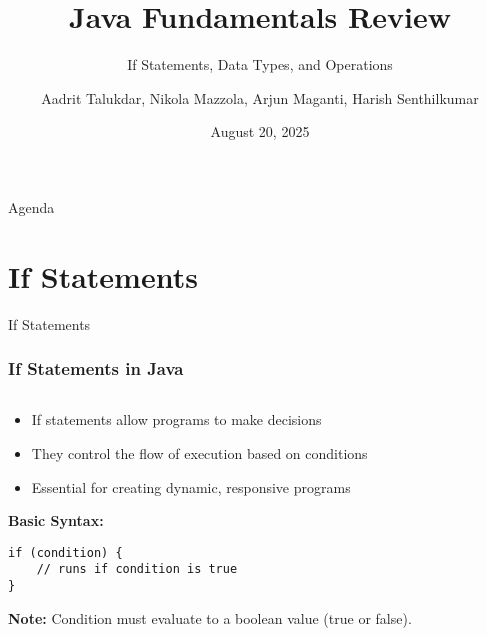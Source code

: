 \documentclass[aspectratio=169]{beamer}
\title{Java Fundamentals Review}
\subtitle{If Statements, Data Types, and Operations}
\author{Aadrit Talukdar, Nikola Mazzola, Arjun Maganti, Harish Senthilkumar}
\institute{Basis Independent Silicon Valley}
\date{August 20, 2025}
\begin{document}
\begin{frame}
    \titlepage
\end{frame}

\begin{frame}{Agenda}
    \tableofcontents
\end{frame}

\section{If Statements}

\begin{frame}[fragile]{If Statements}
    \frametitle{If Statements in Java}
    
    \begin{columns}
        \begin{column}{0.7\textwidth}
            \begin{itemize}
                \item If statements allow programs to make decisions
                \item They control the flow of execution based on conditions
                \item Essential for creating dynamic, responsive programs
            \end{itemize}
            
            \vspace{0.5em}
            
            \textbf{Basic Syntax:}
            \begin{lstlisting}
if (condition) {
    // runs if condition is true
}
            \end{lstlisting}
            
            \small \textbf{Note:} Condition must evaluate to a boolean value (true or false).
        \end{column}
        
        \begin{column}{0.3\textwidth}
            \begin{center}
\end{center}
\end{column}
\end{columns}
\end{frame}
\end{document}
